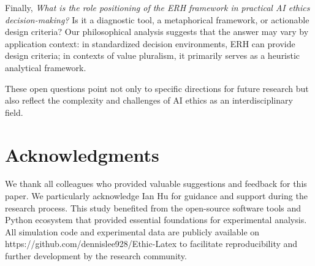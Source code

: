\documentclass[12pt,a4paper]{article}
\theoremstyle{definition}
\theoremstyle{remark}
\begin{document}
Finally, \emph{What is the role positioning of the ERH framework in practical AI ethics decision-making?} Is it a diagnostic tool, a metaphorical framework, or actionable design criteria? Our philosophical analysis suggests that the answer may vary by application context: in standardized decision environments, ERH can provide design criteria; in contexts of value pluralism, it primarily serves as a heuristic analytical framework.

These open questions point not only to specific directions for future research but also reflect the complexity and challenges of AI ethics as an interdisciplinary field.

\section*{Acknowledgments}

We thank all colleagues who provided valuable suggestions and feedback for this paper. We particularly acknowledge Ian Hu for guidance and support during the research process. This study benefited from the open-source software tools and Python ecosystem that provided essential foundations for experimental analysis. All simulation code and experimental data are publicly available on https://github.com/dennislee928/Ethic-Latex to facilitate reproducibility and further development by the research community.




\end{document}
